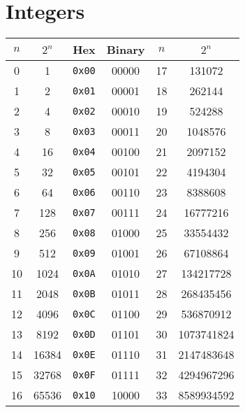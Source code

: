 \documentclass[twocolumn]{article}
\renewcommand{\tt}[1]{\texttt{#1}}
\begin{document}
\section{Integers}
\begin{tabular}{| c || c | c | c ||| c | c |}
    \hline
    $n$ & $2^n$ & Hex & Binary & $n$ & $2^n$\\
    \hline \hline
    0  & 1     & \tt{0x00} & 00000 & 17 & 131072 \\
    \hline
    1  & 2     & \tt{0x01} & 00001 & 18 & 262144 \\
    \hline
    2  & 4     & \tt{0x02} & 00010 & 19 & 524288 \\
    \hline
    3  & 8     & \tt{0x03} & 00011 & 20 & 1048576 \\
    \hline
    4  & 16    & \tt{0x04} & 00100 & 21 & 2097152 \\
    \hline
    5  & 32    & \tt{0x05} & 00101 & 22 & 4194304 \\
    \hline
    6  & 64    & \tt{0x06} & 00110 & 23 & 8388608 \\
    \hline
    7  & 128   & \tt{0x07} & 00111 & 24 & 16777216 \\
    \hline
    8  & 256   & \tt{0x08} & 01000 & 25 & 33554432 \\
    \hline
    9  & 512   & \tt{0x09} & 01001 & 26 & 67108864 \\
    \hline
    10 & 1024  & \tt{0x0A} & 01010 & 27 & 134217728 \\
    \hline
    11 & 2048  & \tt{0x0B} & 01011 & 28 & 268435456 \\
    \hline
    12 & 4096  & \tt{0x0C} & 01100 & 29 & 536870912 \\
    \hline
    13 & 8192  & \tt{0x0D} & 01101 & 30 & 1073741824 \\
    \hline
    14 & 16384 & \tt{0x0E} & 01110 & 31 & 2147483648 \\
    \hline
    15 & 32768 & \tt{0x0F} & 01111 & 32 & 4294967296 \\
    \hline
    16 & 65536 & \tt{0x10} & 10000 & 33 & 8589934592 \\
    \hline
\end{tabular}
\end{document}
